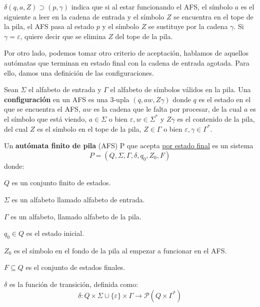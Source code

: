 \begin{nota}
$\delta (q,a,Z) \supset (p,\gamma)$ indica que si al estar funcionando el AFS, el símbolo $a$ es el siguiente a leer en la cadena de entrada y el símbolo $Z$ se encuentra en el tope de la pila, el AFS pasa al estado $p$ y el símbolo $Z$ se sustituye por la cadena $\gamma $. Si $\gamma = \varepsilon $, quiere decir que se elimina $Z$ del tope de la pila. 
\end{nota}



Por otro lado, podemos tomar otro criterio de aceptación, hablamos de aquellos autómatas que terminan en estado final con la cadena de entrada agotada. Para ello, damos una definición de las configuraciones.
\begin{Def}
Sean $\Sigma $ el alfabeto de entrada y $\Gamma $ el alfabeto de símbolos válidos en la pila. Una \textbf{configuración} en un AFS es una $3$-upla $(q,aw,Z\gamma )$ donde $q$ es el estado en el que se encuentra el AFS, $aw$ es la cadena que le falta por procesar, de la cual $a$ es el símbolo que está viendo, $a\in \Sigma $ o bien $\varepsilon, w \in \Sigma^*$ y $Z\gamma $ es el contenido de la pila, del cual $Z$ es el símbolo en el tope de la pila, $Z\in \Gamma$ o bien $\varepsilon, \gamma \in \Gamma^*$. 
\end{Def}

\begin{Def}
Un \textbf{autómata finito de pila} (AFS) P que acepta \underline{por estado final} es un sistema
$$P=(Q,\Sigma,\Gamma, \delta , q_0,Z_0,F)$$
donde: 
\begin{itemize*}
\item $Q$ es un conjunto finito de estados.
\item $\Sigma $ es un alfabeto llamado alfabeto de entrada.
\item $\Gamma $ es un alfabeto, llamado alfabeto de la pila.
\item $q_0\in Q$ es el estado inicial.
\item $Z_0$ es el símbolo en el fondo de la pila al empezar a funcionar en el AFS.
\item $F\subseteq Q$ es el conjunto de estados finales.
\item $\delta $ es la función de transición, definida como:
$$ \delta: Q \times \Sigma \cup \{\varepsilon \} \times \Gamma \rightarrow \mathcal{P}(Q \times \Gamma^*)$$

\end{itemize*}
\end{Def}


